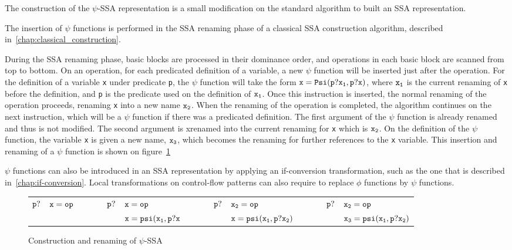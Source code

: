
The construction of the $\psi$-SSA representation is a small
modification on the standard algorithm to built an SSA representation.

The insertion of $\psi$ functions is performed in the SSA renaming
phase of a classical SSA construction algorithm, described
in~\ref{chap:classical_construction}.

During the SSA renaming phase, basic blocks are processed in their
dominance order, and operations in each basic block are scanned from
top to bottom. On an operation, for each predicated definition of a
variable, a new $\psi$ function will be inserted just after the
operation. For the definition of a variable {\tt x} under predicate
{\tt p}, the $\psi$ function will take the form ${\tt x = Psi(p?x_1,
  p?x)}$, where ${\tt x_1}$ is the current renaming of {\tt x} before
the definition, and {\tt p} is the predicate used on the definition of
${\tt x_1}$. Once this instruction is inserted, the normal renaming of
the operation proceeds, renaming {\tt x} into a new name ${\tt
  x_2}$. When the renaming of the operation is completed, the
algorithm continues on the next instruction, which will be a $\psi$
function if there was a predicated definition. The first argument of
the $\psi$ function is already renamed and thus is not modified. The
second argument is xrenamed into the current renaming for {\tt x}
which is ${\tt x_2}$. On the definition of the $\psi$ function, the
variable {\tt x} is given a new name, ${\tt x_3}$, which becomes the
renaming for further references to the {\tt x} variable. This
insertion and renaming of a $\psi$ function is shown on
figure~\ref{fig:psi_ssa_construct}

$\psi$ functions can also be introduced in an SSA representation by
applying an if-conversion transformation, such as the one that is
described in~\ref{chap:if-conversion}. Local transformations on
control-flow patterns can also require to replace $\phi$ functions by
$\psi$ functions.

\begin{figure}
\begin{center}
\footnotesize
\begin{tabular}{llllllllll}
${\tt p?}$ & ${\tt x = op}$ & \ \ \ \  & ${\tt p?}$ & ${\tt x = op}$           & \ \ \ \  & ${\tt p?}$ & ${\tt x_2 = op}$           & \ \ \ \  & ${\tt p?}$ & ${\tt x_2 = op}$ \\
           &                &          &            & ${\tt x = psi(x_1, p?x}$ &           &           & ${\tt x = psi(x_1, p?x_2)}$ &          &           & ${\tt x_3 = psi(x_1, p?x_2)}$ \\
\end{tabular}
\caption{Construction and renaming of $\psi$-SSA}
\label{fig:psi_ssa_construct}
\end{center}
\end{figure}


